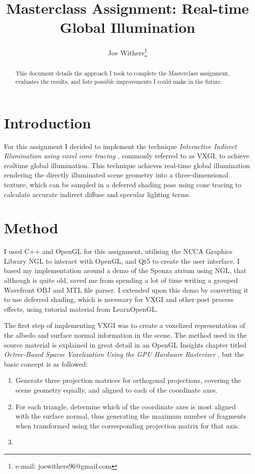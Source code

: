 \documentclass[]{acmsiggraph}
\title{Masterclass Assignment: Real-time Global Illumination}
\author{Joe Withers\thanks{e-mail: joewithers96@gmail.com}}
\begin{document}

\maketitle

\begin{abstract}
This document details the approach I took to complete the Masterclass assignment, evaluates the results, and lists possible improvements I could make in the future.
\end{abstract}

\section{Introduction}
For this assignment I decided to implement the technique \textit{Interactive Indirect Illumination using voxel cone tracing} \cite{crassinneyretsainzgreeneisemann2011}, commonly referred to as VXGI, to achieve realtime global illumination. This technique achieves real-time global illumination rendering the directly illuminated scene geometry into a three-dimensional texture, which can be sampled in a deferred shading pass using cone tracing to calculate accurate indirect diffuse and specular lighting terms.

\section{Method}
I used C++ and OpenGL for this assignment, utilising the NCCA Graphics Library NGL \cite{ngl} to interact with OpenGL, and Qt5 to create the user interface. I based my implementation around a demo of the Sponza atrium using NGL\cite{pbrSponza}, that although is quite old, saved me from spending a lot of time writing a grouped Wavefront OBJ and MTL file parser. I extended upon this demo by converting it to use deferred shading, which is necessary for VXGI and other post process effects, using tutorial material from LearnOpenGL\cite{learnDeferred}.

The first step of implementing VXGI was to create a voxelized representation of the albedo and surface normal information in the scene. The method used in the source material\cite{crassinneyretsainzgreeneisemann2011} is explained in great detail in an OpenGL Insights chapter titled \textit{Octree-Based Sparse Voxelization Using the GPU Hardware Rasterizer} \cite{crassingreen2012}, but the basic concept is as followed:
\begin{enumerate}
	\item Generate three projection matrices for orthogonal projections, covering the scene geometry equally, and aligned to each of the coordinate axes.
	\item For each triangle, determine which of the coordinate axes is most aligned with the surface normal, thus generating the maximum number of fragments when transformed using the corresponding projection matrix for that axis.
	\item
\end{enumerate}
\end{document}
